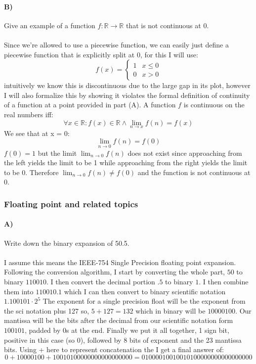\documentclass{article}
\begin{document}
\paragraph{B)}
Give an example of a function $f:\mathbb{R}\to\mathbb{R}$ that is not continuous at 0.
\paragraph{}
Since we're allowed to use a piecewise function, we can easily just define a piecewise function that is explicitly split at 0, for this I will use:
\[f(x) = \begin{cases} 1 & x\leq0 \\0 & x>0 \end{cases}\]
intuitively we know this is discontinuous due to the large gap in its plot, however I will also formalize this by showing it violates the formal definition of continuity of a function at a point provided in part (A). A function $f$ is continuous on the real numbers iff:
\[\forall x\in\mathbb{R}:f(x)\in\mathbb{R}\wedge\lim_{n\to x}f(n) = f(x)\]
We see that at x = 0:
\[\lim_{n\to 0}f(n) = f(0)\]
$f(0) = 1$ but the limit $\lim_{n\to 0}f(n)$ does not exist since approaching from the left yields the limit to be 1 while approaching from the right yields the limit to be 0. Therefore $\lim_{n\to 0}f(n) \neq f(0)$ and the function is not continuous at 0.

\subsubsection{Floating point and related topics}
\paragraph{A)}
Write down the binary expansion of 50.5.
\paragraph{}
I assume this means the IEEE-754 Single Precision floating point expansion. 
\newline
Following the conversion algorithm, I start by converting the whole part, $50$ to binary $110010$. I then convert the decimal portion $.5$ to binary $1$. I then combine them into $110010.1$ which I can then convert to binary scientific notation $1.100101 \cdot 2^5$ The exponent for a single precision float will be the exponent from the sci notation plus 127 so, $5 + 127 = 132$ which in binary will be $10000100$. Our mantissa will be the bits after the decimal from our scientific notation form $100101$, padded by 0s at the end. Finally we put it all together, 1 sign bit, positive in this case (so 0), followed by 8 bits of exponent and the 23 mantissa bits. Using + here to represent concatenation the I get a final answer of:
\[0 + 10000100 + 10010100000000000000000 = 01000010010010100000000000000000\]
\end{document}
